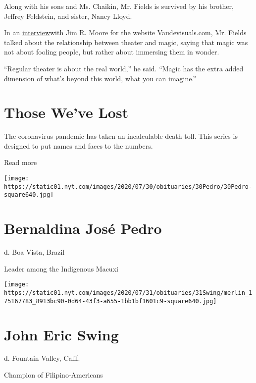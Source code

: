 Along with his sons and Ms. Chaikin, Mr. Fields is survived by his
brother, Jeffrey Feldstein, and sister, Nancy Lloyd.

In an
\href{https://vaudevisuals.com/category/tribute-to-bradley-fields-magician-director-and-mime/}{interview}with
Jim R. Moore for the website Vaudevisuals.com, Mr. Fields talked about
the relationship between theater and magic, saying that magic was not
about fooling people, but rather about immersing them in wonder.

``Regular theater is about the real world,'' he said. ``Magic has the
extra added dimension of what's beyond this world, what you can
imagine.''

\href{https://www.nytimes.com/interactive/2020/obituaries/people-died-coronavirus-obituaries.html?action=click\&pgtype=Article\&state=default\&region=BELOW_MAIN_CONTENT\&context=covid_obits_promo}{}

\hypertarget{those-weve-lost}{%
\section{Those We've Lost}\label{those-weve-lost}}

The coronavirus pandemic has taken an incalculable death toll. This
series is designed to put names and faces to the numbers.

Read more

\texttt{[image: https://static01.nyt.com/images/2020/07/30/obituaries/30Pedro/30Pedro-square640.jpg]}

\hypertarget{bernaldina-josuxe9-pedro}{%
\section{Bernaldina José Pedro}\label{bernaldina-josuxe9-pedro}}

d. Boa Vista, Brazil

Leader among the Indigenous Macuxi

\texttt{[image: https://static01.nyt.com/images/2020/07/31/obituaries/31Swing/merlin\_175167783\_8913bc90-0d64-43f3-a655-1bb1bf1601c9-square640.jpg]}

\hypertarget{john-eric-swing}{%
\section{John Eric Swing}\label{john-eric-swing}}

d. Fountain Valley, Calif.

Champion of Filipino-Americans

